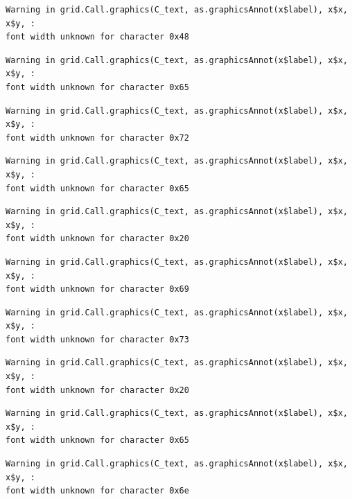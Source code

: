 \documentclass[
  letterpaper,
  DIV=11,
  numbers=noendperiod]{scrreprt}
\begin{document}
\begin{verbatim}
Warning in grid.Call.graphics(C_text, as.graphicsAnnot(x$label), x$x, x$y, :
font width unknown for character 0x48
\end{verbatim}

\begin{verbatim}
Warning in grid.Call.graphics(C_text, as.graphicsAnnot(x$label), x$x, x$y, :
font width unknown for character 0x65
\end{verbatim}

\begin{verbatim}
Warning in grid.Call.graphics(C_text, as.graphicsAnnot(x$label), x$x, x$y, :
font width unknown for character 0x72
\end{verbatim}

\begin{verbatim}
Warning in grid.Call.graphics(C_text, as.graphicsAnnot(x$label), x$x, x$y, :
font width unknown for character 0x65
\end{verbatim}

\begin{verbatim}
Warning in grid.Call.graphics(C_text, as.graphicsAnnot(x$label), x$x, x$y, :
font width unknown for character 0x20
\end{verbatim}

\begin{verbatim}
Warning in grid.Call.graphics(C_text, as.graphicsAnnot(x$label), x$x, x$y, :
font width unknown for character 0x69
\end{verbatim}

\begin{verbatim}
Warning in grid.Call.graphics(C_text, as.graphicsAnnot(x$label), x$x, x$y, :
font width unknown for character 0x73
\end{verbatim}

\begin{verbatim}
Warning in grid.Call.graphics(C_text, as.graphicsAnnot(x$label), x$x, x$y, :
font width unknown for character 0x20
\end{verbatim}

\begin{verbatim}
Warning in grid.Call.graphics(C_text, as.graphicsAnnot(x$label), x$x, x$y, :
font width unknown for character 0x65
\end{verbatim}

\begin{verbatim}
Warning in grid.Call.graphics(C_text, as.graphicsAnnot(x$label), x$x, x$y, :
font width unknown for character 0x6e
\end{verbatim}
\end{document}
